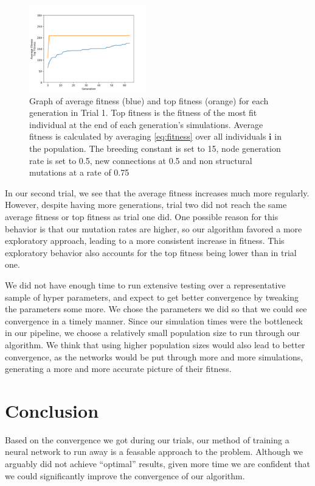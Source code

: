 \documentclass{article}
\begin{document}
\begin{figure}[h]\label{fig:fitness graph}
\centering
\includegraphics[width=0.45\textwidth]{fig_2}
\begin{changemargin}{0.15in}{0.15in}
  \caption{Graph of average fitness (blue) and top fitness (orange) for each
    generation in Trial 1. Top fitness is the fitness of the most fit individual
    at the end of each generation's simulations. Average fitness is calculated
    by averaging \eqref{eq:fitness} over all individuals $\bm{i}$ in the
    population. The breeding constant is set to 15, node generation rate is set
    to 0.5, new connections at 0.5 and non structural mutations at a rate of
    0.75}
\end{changemargin}
\end{figure}

In our second trial, we see that the average fitness increases much more
regularly. However, despite having more generations, trial two did not reach the
same average fitness or top fitness as trial one did. One possible reason for
this behavior is that our mutation rates are higher, so our algorithm favored a
more exploratory approach, leading to a more consistent increase in
fitness. This exploratory behavior also accounts for the top fitness being lower
than in trial one.

We did not have enough time to run extensive testing over a representative
sample of hyper parameters, and expect to get better convergence by tweaking the
parameters some more. We chose the parameters we did so that we could see
convergence in a timely manner. Since our simulation times were the bottleneck
in our pipeline, we choose a relatively small population size to run through our
algorithm. We think that using higher population sizes would also lead to better
convergence, as the networks would be put through more and more simulations,
generating a more and more accurate picture of their fitness.

\section{Conclusion}
Based on the convergence we got during our trials, our method of training a
neural network to run away is a feasable approach to the problem. Although we
arguably did not achieve ``optimal'' results, given more time we are confident
that we could significantly improve the convergence of our algorithm.
\end{document}
